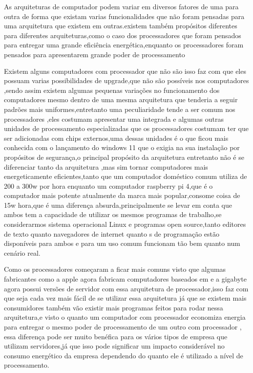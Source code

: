 \documentclass[
	12pt,				%
	openright,			%
	oneside,			%
	a4paper,			%
	english,			%
	french,				%
	spanish,			%
	brazil,				%
	]{abntex2}
\begin{document}
As arquiteturas de computador podem variar em diversos fatores de uma para outra de forma que existam varias funcionalidades que não foram pensadas para uma arquitetura que existem em outras.existem também propósitos diferentes para diferentes arquiteturas,como o caso dos processadores  que foram pensados para entregar uma grande eficiência energética,enquanto os processadores  foram pensados para apresentarem grande poder de processamento\newline

Existem alguns computadores com processador  que não são  isso faz com que eles possuam varias possibilidades de upgrade,que não são possíveis nos computadores ,sendo assim existem algumas pequenas variações no funcionamento dos computadores mesmo dentro de uma mesma arquitetura que tenderia a seguir padrões mais uniformes,entretanto uma peculiaridade tende a ser comum nos processadores ,eles costumam apresentar uma  integrada e algumas outras unidades de processamento especializadas que os processadores  costumam ter que ser adicionadas com chips externos,uma dessas unidades é o  que ficou mais conhecida com o lançamento do windows 11 que o exigia na sua instalação por propósitos de segurança,o principal propósito da arquitetura  entretanto não é se diferenciar tanto da arquitetura ,mas sim tornar computadores mais energeticamente eficientes,tanto que um computador doméstico comum utiliza de 200 a 300w por hora enquanto um computador raspberry pi 4,que é o computador  mais potente atualmente da marca mais popular,consome coisa de 15w hora,que é uma diferença absurda,principalmente se levar em conta que ambos tem a capacidade de utilizar os mesmos programas de trabalho,se considerarmos sistema operacional Linux e programas open source,tanto editores de texto quanto navegadores de internet quanto s de programação estão disponíveis para ambos e para um uso comum funcionam tão bem quanto num cenário real.\newline

Como os processadores  começaram a ficar mais comuns visto que algumas fabricantes como a apple agora fabricam computadores baseados em  e a gigabyte agora possui versões de servidor com essa arquitetura de processador,isso faz com que seja cada vez mais fácil de se utilizar essa arquitetura já que se existem mais consumidores também vão existir mais programas feitos para rodar nessa arquitetura,e visto o quanto um computador com processador  economiza energia para entregar o mesmo poder de processamento de um outro com processador  , essa diferença pode ser muito benéfica para os vários tipos de empresa que utilizam servidores,já que isso pode significar um impacto considerável no consumo energético da empresa dependendo do quanto ele é utilizado a nível de processamento.\newline
\end{document}
